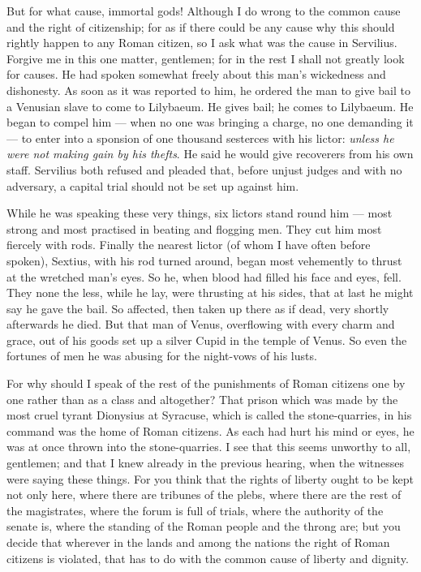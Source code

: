  But for what cause, immortal gods! Although I do wrong to the common cause and the right of citizenship; for as if there could be any cause why this should rightly happen to any Roman citizen, so I ask what was the cause in Servilius. Forgive me in this one matter, gentlemen; for in the rest I shall not greatly look for causes. He had spoken somewhat freely about this man's wickedness and dishonesty. As soon as it was reported to him, he ordered the man to give bail to a Venusian slave to come to Lilybaeum. He gives bail; he comes to Lilybaeum. He began to compel him --- when no one was bringing a charge, no one demanding it --- to enter into a sponsion of one thousand sesterces with his lictor: \textit{unless he were not making gain by his thefts}. He said he would give recoverers from his own staff. Servilius both refused and pleaded that, before unjust judges and with no adversary, a capital trial should not be set up against him.

 While he was speaking these very things, six lictors stand round him --- most strong and most practised in beating and flogging men. They cut him most fiercely with rods. Finally the nearest lictor (of whom I have often before spoken), Sextius, with his rod turned around, began most vehemently to thrust at the wretched man's eyes. So he, when blood had filled his face and eyes, fell. They none the less, while he lay, were thrusting at his sides, that at last he might say he gave the bail. So affected, then taken up there as if dead, very shortly afterwards he died. But that man of Venus, overflowing with every charm and grace, out of his goods set up a silver Cupid in the temple of Venus. So even the fortunes of men he was abusing for the night-vows of his lusts.

 For why should I speak of the rest of the punishments of Roman citizens one by one rather than as a class and altogether? That prison which was made by the most cruel tyrant Dionysius at Syracuse, which is called the stone-quarries, in his command was the home of Roman citizens. As each had hurt his mind or eyes, he was at once thrown into the stone-quarries. I see that this seems unworthy to all, gentlemen; and that I knew already in the previous hearing, when the witnesses were saying these things. For you think that the rights of liberty ought to be kept not only here, where there are tribunes of the plebs, where there are the rest of the magistrates, where the forum is full of trials, where the authority of the senate is, where the standing of the Roman people and the throng are; but you decide that wherever in the lands and among the nations the right of Roman citizens is violated, that has to do with the common cause of liberty and dignity.

